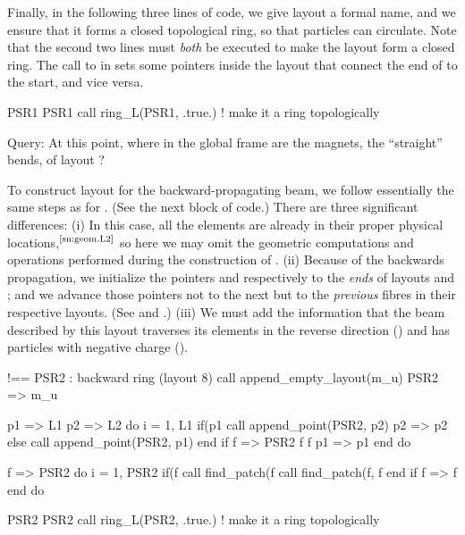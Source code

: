 Finally, in the following three lines of code, we give layout 
a formal name, and we ensure that it forms a closed topological ring,
so that particles can circulate. Note that the second two lines must
\emph{both} be executed to make the layout  form a closed ring.
The call to  in  sets some pointers inside
the layout  that connect the end of  to the start,
and vice versa.
%
\begin{ptccode}
PSR1%
PSR1%
call ring_L(PSR1, .true.) ! make it a ring topologically \label{lin:psr1.ringL}
\end{ptccode}

Query: At this point, where in the global frame are the magnets,
the ``straight'' bends, of layout ?%

To construct layout  for the backward-propagating beam,
we follow essentially the same steps as for . (See the
next block of code.) There are three significant differences:
(i) In this case, all the elements are already in their proper
physical locations,${}^\text{\ref{sn:geom.L2}}$ so here we may
omit the geometric computations
and operations performed during the construction of .
(ii) Because of the backwards propagation, we initialize the
pointers  and  respectively to the \emph{ends} of
layouts  and ; and we advance those pointers not
to the next but to the \emph{previous} fibres in their respective
layouts. (See  and .)
(iii) We must add the information that the beam described by this
layout traverses its elements in the reverse direction
() and has particles with negative charge
().%
%
\begin{ptccode}
!== PSR2 : backward ring (layout 8)
call append_empty_layout(m_u)
PSR2 => m_u%

p1 => L1%
p2 => L2%
do i = 1, L1%
  if(p1%
    call append_point(PSR2, p2)
    p2 => p2%
  else
    call append_point(PSR2, p1)
  end if
  f => PSR2%
  f%
  f%
  p1 => p1%
end do

f => PSR2%
do i = 1, PSR2%
  if(f%
    call find_patch(f%
    call find_patch(f, f%
  end if
  f => f%
end do

PSR2%
PSR2%
call ring_L(PSR2, .true.) ! make it a ring topologically
\end{ptccode}

